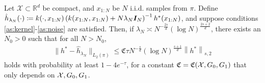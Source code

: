 \begin{prop}\label{prop:noiseless_krr}
Let $\mathcal{X} \subset \mathbb{R}^d$ be compact, and $x_{1:N}$ be $N$ i.i.d. samples from $\pi$. Define
$\hat{h}_{\lambda_N}(\cdot) \coloneq k(\cdot, x_{1:N}) \left( k(x_{1:N}, x_{1:N}) + N \lambda_N \boldsymbol{I}_N \right)^{-1} h^\ast(x_{1:N})$, and suppose conditions \ref{as:kernel}-\ref{as:noise} are satisfied. Then, if $\lambda_N \asymp N^{-\frac{2 s}{d}} (\log N)^{\frac{2s+2}{d}}$, there exists an $N_0>0$ such that for all $N > N_0$, 
\begin{align}
\| h^\ast - \hat{h}_{\lambda_N} \|_{L_2(\pi)} \leq \mathfrak{C} \tau N^{-\frac{s}{d}} (\log N)^{\frac{s+1}{d}} \left\| h^\ast \right \|_{s,2}
\end{align} 
holds with probability at least $1 - 4e^{-\tau}$, for a constant $\mathfrak{C}=\mathfrak{C}(\mathcal{X}, G_0, G_1)$ that only depends on $\mathcal{X}, G_0, G_1$.
\end{prop}
